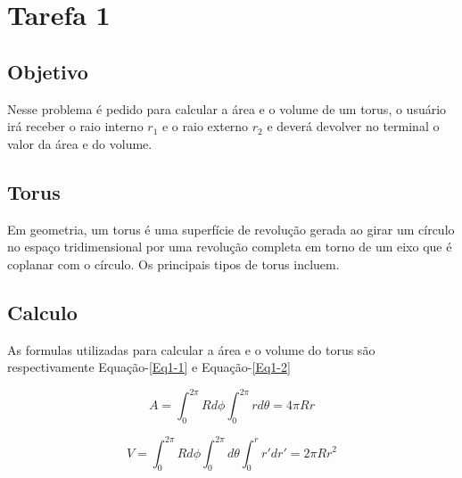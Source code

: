 \chapter*{Tarefa 1}

\section*{Objetivo}

Nesse problema é pedido para calcular a área e o volume de um torus, o usuário irá receber o raio interno $r_1$ e o raio externo $r_2$ e deverá devolver no terminal o valor da área e do volume.

\section*{Torus}

Em geometria, um torus é uma superfície de revolução gerada ao girar um círculo no espaço tridimensional por uma revolução completa em torno de um eixo que é coplanar com o círculo. Os principais tipos de torus incluem. 


\section*{Calculo}
As formulas utilizadas para calcular a área e o volume do torus são respectivamente Equação-\ref{Eq1-1} e Equação-\ref{Eq1-2}

\begin{equation} \label{Eq1-1}
    A = \int_{0}^{2\pi}Rd\phi\int_{0}^{2\pi}rd\theta = 4\pi R r
\end{equation}

\begin{equation} \label{Eq1-2}
    V = \int_{0}^{2\pi}Rd\phi\int_{0}^{2\pi}d\theta\int_{0}^{r}r'dr' = 2\pi R r^2
\end{equation}
